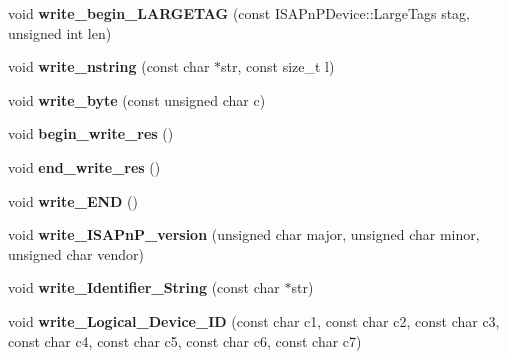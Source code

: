 \begin{DoxyCompactItemize}
\item 
\hypertarget{classISAPnPDevice_a05bed908a96cd203c1b8b391f33884a2}{void {\bfseries write\-\_\-begin\-\_\-\-L\-A\-R\-G\-E\-T\-A\-G} (const I\-S\-A\-Pn\-P\-Device\-::\-Large\-Tags stag, unsigned int len)}\label{classISAPnPDevice_a05bed908a96cd203c1b8b391f33884a2}

\item 
\hypertarget{classISAPnPDevice_a5819167c3d0e8e62831ef58fd28c1b21}{void {\bfseries write\-\_\-nstring} (const char $\ast$str, const size\-\_\-t l)}\label{classISAPnPDevice_a5819167c3d0e8e62831ef58fd28c1b21}

\item 
\hypertarget{classISAPnPDevice_aa0b89495be34f6c654d1177c6883789b}{void {\bfseries write\-\_\-byte} (const unsigned char c)}\label{classISAPnPDevice_aa0b89495be34f6c654d1177c6883789b}

\item 
\hypertarget{classISAPnPDevice_a97bb310a59a7fdf185b26776fc04bc4f}{void {\bfseries begin\-\_\-write\-\_\-res} ()}\label{classISAPnPDevice_a97bb310a59a7fdf185b26776fc04bc4f}

\item 
\hypertarget{classISAPnPDevice_a2117ff5e139941025c99dfe41538fbef}{void {\bfseries end\-\_\-write\-\_\-res} ()}\label{classISAPnPDevice_a2117ff5e139941025c99dfe41538fbef}

\item 
\hypertarget{classISAPnPDevice_a1d3dc3e65ec7a81b75366f9947d62804}{void {\bfseries write\-\_\-\-E\-N\-D} ()}\label{classISAPnPDevice_a1d3dc3e65ec7a81b75366f9947d62804}

\item 
\hypertarget{classISAPnPDevice_a731c79a2942bd32de7a92531c378da49}{void {\bfseries write\-\_\-\-I\-S\-A\-Pn\-P\-\_\-version} (unsigned char major, unsigned char minor, unsigned char vendor)}\label{classISAPnPDevice_a731c79a2942bd32de7a92531c378da49}

\item 
\hypertarget{classISAPnPDevice_a11b04e87db92c1ec88f12b880560d598}{void {\bfseries write\-\_\-\-Identifier\-\_\-\-String} (const char $\ast$str)}\label{classISAPnPDevice_a11b04e87db92c1ec88f12b880560d598}

\item 
\hypertarget{classISAPnPDevice_ab75df5a9d1778b9f72a7a4c41590e03e}{void {\bfseries write\-\_\-\-Logical\-\_\-\-Device\-\_\-\-I\-D} (const char c1, const char c2, const char c3, const char c4, const char c5, const char c6, const char c7)}\label{classISAPnPDevice_ab75df5a9d1778b9f72a7a4c41590e03e}


\end{DoxyCompactItemize}
